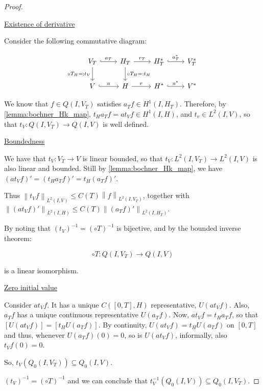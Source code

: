 \documentclass[english,a4paper,12pt,oneside]{scrbook}
\theoremstyle{break}
\newenvironment{mproof}[1][\proofname]{%
  \begin{proof}[#1]$ $\par\nobreak\ignorespaces
}{%
  \end{proof}
}
\renewcommand*{\proofname}{Proof}
\theoremstyle{remark}
\newcommand{\norm}[1]{\left\lVert#1\right\rVert}
\begin{document}
\begin{mproof}

\underline{Existence of derivative}

Consider the following commutative diagram:

\[\begin{tikzcd}
	{V_T} & {H_T} & {H_T^*} & {V^*_T} \\
	V & H & {H^*} & {V^*}
	\arrow["{a_T}", hook, from=1-1, to=1-2]
	\arrow["{r_T}", from=1-2, to=1-3]
	\arrow["{a_T^*}", hook, from=1-3, to=1-4]
	\arrow["r", from=2-2, to=2-3]
	\arrow["a^*", hook, from=2-3, to=2-4]
	\arrow["a", hook, from=2-1, to=2-2]
	\arrow["{\circ T_H=:t_V}"', from=1-1, to=2-1]
	\arrow["{\circ T_H=:t_H}", from=1-2, to=2-2]
\end{tikzcd}\]

We know that $f\in Q(I,V_T)$ satisfies $a_Tf \in H^1(I,H_T)$. Therefore, by \cref{lemma:bochner_Hk_map}, $t_H a_T f =a t_V f \in H^1(I,H)$, and $t_v  \in L^2(I,V)$, so that $t_V : Q(I,V_T)\rightarrow Q(I,V)$ is well defined.

\underline{Boundedness}

We have that $t_V: V_T \rightarrow V$ is linear bounded, so that $t_V: L^2(I,V_T)\rightarrow L^2(I,V)$ is also linear and bounded. Still by \cref{lemma:bochner_Hk_map}, we have $(a t_V f )' = (t_H a_T f)' = t_H(a_T f)'$.

Thus $\norm{t_V f}_{L^2(I, V)}\leq C(T) \norm{f}_{L^2(I, V_T)}$, together with $\norm{(a t_V f )'}_{L^2(I, H)}\leq C(T) \norm{(a_T f)'}_{L^2(I, H_T)}$.

By noting that $(t_V)^{-1} = (\circ T)^{-1} $ is bijective, and by the bounded inverse theorem:

$$\circ T : Q(I,V_T)\rightarrow Q(I,V)$$

is a linear isomorphism.

\underline{Zero initial value}

Consider $at_V f$. It has a unique $C([0,T],H)$ representative, $U(at_V f)$. Also, $a_T f$ has a unique continuous representative $U(a_T f)$. Now, $at_V f = t_H a_T f$, so that $[U(at_V f)] = [t_H U(a_T f)]$. By continuity, $U(at_V f) = t_H U(a_T f)$ on $[0,T]$ and thus, whenever $U(a_T f)(0)=0$, so is $U(at_V f)$, informally, also $t_Vf (0) =0$. 

So, $t_V(Q_0(I,V_T))\subseteq Q_0(I,V)$.

$(t_V)^{-1} = (\circ T)^{-1}$ and we can conclude that  $t_V^{-1}(Q_0(I,V))\subseteq Q_0(I,V_T)$.

\end{mproof}
\end{document}
